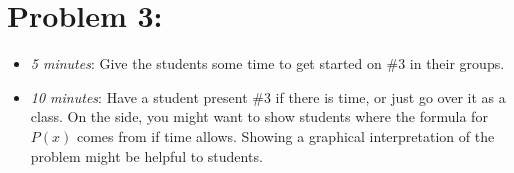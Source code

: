 \documentclass[handout,nooutcomes]{ximera}
\begin{document}
	
	
\section*{Problem 3:}

	\begin{itemize}
	
	\item  \emph{5 minutes}:  Give the students some time to get started on \#3 in their groups.
	
	\item  \emph{10 minutes}:  Have a student present \#3  if there is time, or just go over it as a class.  On the side, you might want to show students where the formula for $P(x)$ comes from if time allows.  Showing a graphical interpretation of the problem might be helpful to students.
	
	\end{itemize}
	
	
	
	

	
	

	
	
	

	
	
	
\end{document}
